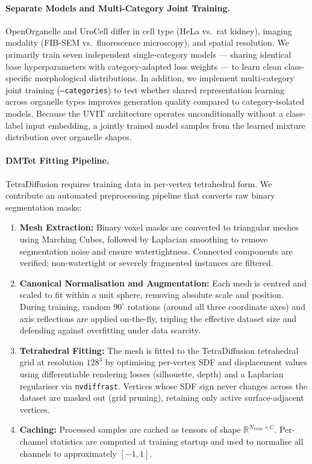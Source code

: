 \documentclass[10pt, a4paper, twocolumn]{article}
\begin{document}
\paragraph{Separate Models and Multi-Category Joint Training.}
OpenOrganelle and UroCell differ in cell type (HeLa vs.\ rat kidney), imaging modality (FIB-SEM vs.\ fluorescence microscopy), and spatial resolution. We primarily train seven independent single-category models — sharing identical base hyperparameters with category-adapted loss weights — to learn clean class-specific morphological distributions. In addition, we implement multi-category joint training (\texttt{--categories}) to test whether shared representation learning across organelle types improves generation quality compared to category-isolated models. Because the UVIT architecture operates unconditionally without a class-label input embedding, a jointly trained model samples from the learned mixture distribution over organelle shapes.

\paragraph{DMTet Fitting Pipeline.}
TetraDiffusion requires training data in per-vertex tetrahedral form. We contribute an automated preprocessing pipeline that converts raw binary segmentation masks:
\begin{enumerate}
    \item \textbf{Mesh Extraction:} Binary voxel masks are converted to triangular meshes using Marching Cubes, followed by Laplacian smoothing to remove segmentation noise and ensure watertightness. Connected components are verified; non-watertight or severely fragmented instances are filtered.
    \item \textbf{Canonical Normalisation and Augmentation:} Each mesh is centred and scaled to fit within a unit sphere, removing absolute scale and position. During training, random $90^\circ$ rotations (around all three coordinate axes) and axis reflections are applied on-the-fly, tripling the effective dataset size and defending against overfitting under data scarcity.
    \item \textbf{Tetrahedral Fitting:} The mesh is fitted to the TetraDiffusion tetrahedral grid at resolution $128^3$ by optimising per-vertex SDF and displacement values using differentiable rendering losses (silhouette, depth) and a Laplacian regulariser via \texttt{nvdiffrast}. Vertices whose SDF sign never changes across the dataset are masked out (grid pruning), retaining only active surface-adjacent vertices.
    \item \textbf{Caching:} Processed samples are cached as tensors of shape $\mathbb{R}^{N_{\text{verts}} \times C}$. Per-channel statistics are computed at training startup and used to normalise all channels to approximately $[-1, 1]$.
\end{enumerate}
\end{document}

